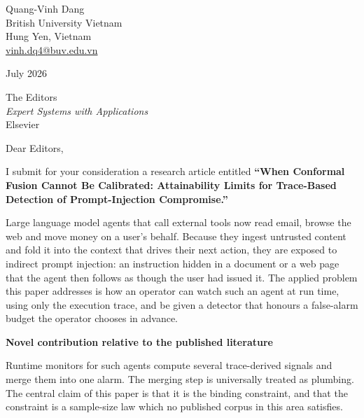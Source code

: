 \documentclass[10pt]{article}
\begin{document}
\noindent
Quang-Vinh Dang\\
British University Vietnam\\
Hung Yen, Vietnam\\
\href{mailto:vinh.dq4@buv.edu.vn}{vinh.dq4@buv.edu.vn}

\vspace{0.6em}
 July 2026

\vspace{0.6em}
\noindent
The Editors\\
\emph{Expert Systems with Applications}\\
Elsevier

\vspace{0.7em}
\noindent Dear Editors,

\vspace{0.5em}
I submit for your consideration a research article entitled \textbf{``When
Conformal Fusion Cannot Be Calibrated: Attainability Limits for Trace-Based
Detection of Prompt-Injection Compromise.''}

Large language model agents that call external tools now read email, browse the
web and move money on a user's behalf. Because they ingest untrusted content and
fold it into the context that drives their next action, they are exposed to
indirect prompt injection: an instruction hidden in a document or a web page that
the agent then follows as though the user had issued it. The applied problem this
paper addresses is how an operator can watch such an agent at run time, using only
the execution trace, and be given a detector that honours a false-alarm budget the
operator chooses in advance.

\vspace{0.4em}
\noindent\textbf{Novel contribution relative to the published literature}

\vspace{0.3em}
Runtime monitors for such agents compute several trace-derived signals and merge
them into one alarm. The merging step is universally treated as plumbing. The
central claim of this paper is that it is the binding constraint, and that the
constraint is a sample-size law which no published corpus in this area satisfies.
\end{document}
